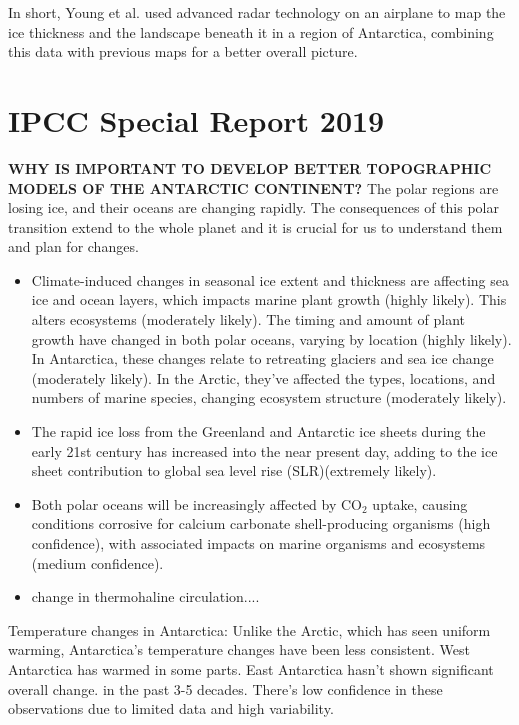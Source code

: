 In short, Young et al. used advanced radar technology on an airplane to map the ice thickness and the landscape beneath it in a region of Antarctica, combining this data with previous maps for a better overall picture.

\chapter{IPCC Special Report 2019}\label{n2}
\textbf{WHY IS IMPORTANT TO DEVELOP BETTER TOPOGRAPHIC MODELS OF THE ANTARCTIC CONTINENT?}
The polar regions are losing ice, and their oceans are changing rapidly. The consequences of this polar transition extend to the whole planet and it is crucial for us to understand them and plan for changes.
\begin{itemize}
\item Climate-induced changes in seasonal ice extent and thickness are affecting sea ice and ocean layers, which impacts marine plant growth (highly likely). This alters ecosystems (moderately likely). The timing and amount of plant growth have changed in both polar oceans, varying by location (highly likely). In Antarctica, these changes relate to retreating glaciers and sea ice change (moderately likely). In the Arctic, they've affected the types, locations, and numbers of marine species, changing ecosystem structure (moderately likely)\cite{O_C_in_changingClimate}.
\item The rapid ice loss from the Greenland and Antarctic ice sheets during the early 21st century has increased into the near present day, adding to the ice sheet contribution to global sea level rise (SLR)(extremely likely)\cite{O_C_in_changingClimate}.
\item Both polar oceans will be increasingly affected by $\mathrm{CO_2}$ uptake, causing conditions corrosive for calcium carbonate shell-producing organisms (high conﬁdence), with associated impacts on marine organisms and ecosystems (medium conﬁdence)\cite{O_C_in_changingClimate}.
\item change in thermohaline circulation....
\end{itemize}

Temperature changes in Antarctica:
Unlike the Arctic, which has seen uniform warming, Antarctica's temperature changes have been less consistent. West Antarctica has warmed in some parts. East Antarctica hasn't shown significant overall change. in the past 3-5 decades. There's low confidence in these observations due to limited data and high variability.

